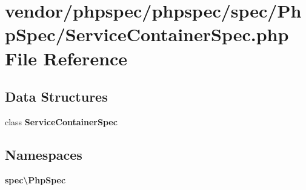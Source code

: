 \section{vendor/phpspec/phpspec/spec/\+Php\+Spec/\+Service\+Container\+Spec.php File Reference}
\label{_service_container_spec_8php}
\subsection*{Data Structures}
\begin{DoxyCompactItemize}
\item 
class {\bf Service\+Container\+Spec}
\end{DoxyCompactItemize}
\subsection*{Namespaces}
\begin{DoxyCompactItemize}
\item 
 {\bf spec\textbackslash{}\+Php\+Spec}
\end{DoxyCompactItemize}
